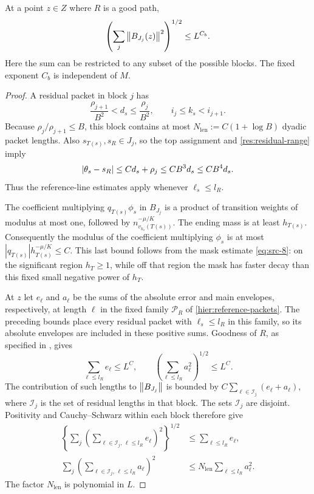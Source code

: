\begin{lemma}
\label{res:block-square}
At a point $z\in Z$ where $R$ is a good path,
\begin{equation}
  \left(\sum_j\left\|B_{J_j}(z)\right\|^2\right)^{1/2}\le L^{C_b}.
  \label{res:block-square-bound}
\end{equation}
Here the sum can be restricted to any subset of the possible blocks.
The fixed exponent $C_b$ is independent of $M$.
\end{lemma}

\begin{proof}
A residual packet in block $j$ has
\begin{equation}
  \frac{\rho_{j+1}}{B^2}<d_s\le\frac{\rho_j}{B^2},
  \qquad i_j\le k_s<i_{j+1}.
  \label{res:residual-range}
\end{equation}
Because $\rho_j/\rho_{j+1}\le B$, this block contains at most
$N_{\mathrm{len}}:=C(1+\log B)$ dyadic packet lengths.  Also $s_{T(s)},s_R\in J_j$,
so the top assignment and \eqref{res:residual-range} imply
\[
  \left|\theta_s-s_R\right|
     \le C d_s+\rho_j
     \le C B^3 d_s\le C B^4d_s.
\]
Thus the reference-line estimates apply whenever $\ell_s\le l_R$.

The coefficient multiplying $q_{T(s)}\phi_s$ in $B_{J_j}$ is a
product of transition weights of modulus at most one, followed by
$n_{v_{k_s}(T(s))}^{-\mu/K}$.  The ending mass is at least
$h_{T(s)}$.  Consequently the modulus of the coefficient multiplying
$\phi_s$ is at most
$|q_{T(s)}|h_{T(s)}^{-\mu/K}\le C$.  This last bound follows from
the mask estimate \eqref{eq:src-8}: on the significant region
$h_T\ge1$, while off that region the mask has faster decay than
this fixed small negative power of $h_T$.

At $z$ let $e_\ell$ and $a_\ell$ be the sums of the absolute error and
main envelopes, respectively, at length $\ell$ in the fixed family
$\mathcal P_R$ of \eqref{hier:reference-packets}.  The preceding bounds
place every residual packet with $\ell_s\le l_R$ in this family, so its
absolute envelopes are included in these positive sums.  Goodness of $R$,
as specified in , gives
\[
  \sum_{\ell\le l_R}e_\ell\le L^C,
  \qquad
  \left(\sum_{\ell\le l_R}a_\ell^2\right)^{1/2}\le L^C.
\]
The contribution of such lengths to $\left\|B_{J_j}\right\|$ is bounded by
$C\sum_{\ell\in\mathcal I_j}(e_\ell+a_\ell)$, where
$\mathcal I_j$ is the set of residual lengths in that block.
The sets $\mathcal I_j$ are disjoint.  Positivity and
Cauchy--Schwarz within each block therefore give
\begin{align*}
 \left\{\sum_j
    \left(\sum_{\ell\in\mathcal I_j,\,\ell\le l_R}
                         e_\ell\right)^2\right\}^{1/2}
       &\le\sum_{\ell\le l_R}e_\ell,\\
 \sum_j\left(\sum_{\ell\in\mathcal I_j,\,\ell\le l_R}
                         a_\ell\right)^2
       &\le N_{\mathrm{len}}\sum_{\ell\le l_R}a_\ell^2.
\end{align*}
The factor $N_{\mathrm{len}}$ is polynomial in $L$.


\end{proof}
